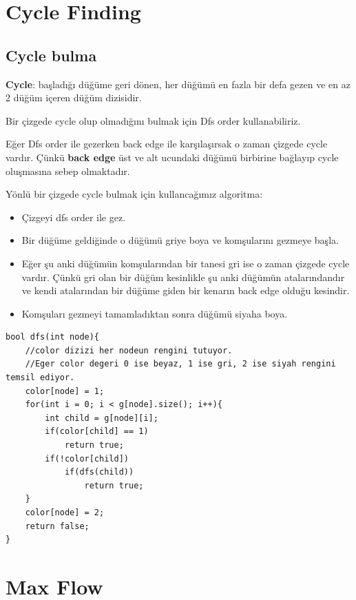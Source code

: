 \documentclass[12pt]{article}
\begin{document}
    \section{Cycle Finding}
    \subsection{Cycle bulma}
    
    \textbf{Cycle}: başladığı düğüme geri dönen, her düğümü en fazla bir defa gezen ve en az 2 düğüm içeren düğüm dizisidir.
    
    Bir çizgede cycle olup olmadığını bulmak için Dfs order kullanabiliriz.
    
    Eğer Dfs order ile gezerken back edge ile karşılaşırsak o zaman çizgede cycle vardır. Çünkü \textbf{back edge} üst ve alt ucundaki düğümü birbirine bağlayıp cycle oluşmasına sebep olmaktadır.

    Yönlü bir çizgede cycle bulmak için kullancağımız algoritma:
    
\begin{itemize}
    \item Çizgeyi dfs order ile gez.
	\item Bir düğüme geldiğinde o düğümü griye boya ve komşularını gezmeye başla.
	\item Eğer şu anki düğümün komşularından bir tanesi gri ise o zaman çizgede cycle vardır. Çünkü gri olan bir düğüm kesinlikle şu anki düğümün atalarındandır ve kendi atalarından bir düğüme giden bir kenarın back edge olduğu kesindir.
	\item Komşuları gezmeyi tamamladıktan sonra düğümü siyaha boya.
\end{itemize}


    
    \begin{verbatim}
bool dfs(int node){
    //color dizizi her nodeun rengini tutuyor.
    //Eger color degeri 0 ise beyaz, 1 ise gri, 2 ise siyah rengini temsil ediyor.
	color[node] = 1;
	for(int i = 0; i < g[node].size(); i++){
		int child = g[node][i];
		if(color[child] == 1)
			return true;
		if(!color[child])
			if(dfs(child))
				return true;
	}
	color[node] = 2;
	return false;
}

    \end{verbatim}


    \cleardoublepage

    \section{Max Flow}
\end{document}
